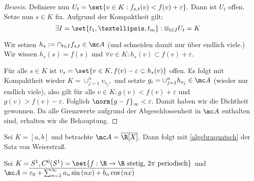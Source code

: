 \begin{theorem}
\begin{proof}[Beweis]
		Definiere nun $U_t = \set{v \in K: f_{s, t}(v) < f(v)+\varepsilon}.$ Dann ist $U_t$ offen. Setze nun $s \in K$ fix. Aufgrund der Kompaktheit gilt: \[\exists I = \set{t_1, …, t_m}: \Cup_{t \in I}U_t = K\] 
		
		Wir setzen $h_s := \cap_{t \in I}f_{s, t} \in \mc A$ (und schneiden damit nur über endlich viele.) Wir wissen $h_s(s)=f(s)$ und $\forall v \in K: h_s(v) \subset f(v)+\varepsilon.$
		
		Für alle $s \in K$ ist $v_s = \set{v \in K, f(v)- \varepsilon \subset h_s(v)}$ offen. Es folgt mit Kompaktheit wieder $K = \cup_{j=1}^n v_{s_j},$ und setzte $g_i = \cup_{j=1}^n h_{s_j} \in \mc A$ (wieder nur endlich viele), also gilt für alle $v \in K: g(v) < f(v)+\varepsilon$ und $g(v) > f(v) -\varepsilon.$ Folglich $\norm{g-f}_{\infty} < \varepsilon.$ Damit haben wir die Dichtheit gewonnen. Da alle Grenzwerte aufgrund der Abgeschlossenheit in $\mc A$ enthalten sind, erhalten wir die Behauptung.
		
	\end{proof}
	
\end{theorem}


\begin{ex} Sei $K = [a, b]$ und betrachte $\mc A = \overline{\R[X]}.$ Dann folgt mit \ref{algebraquatsch} der Satz von Weierstraß. 
	
\end{ex}


\begin{ex} Sei $K = S^1, C^0(S^1) = \set{f: \R \to \R \text{ stetig, }2\pi \text{ periodisch}}$ und \\\(\mc A = \overline{\varepsilon_0 + \sum_{n = 1}^{\infty}a_n \sin{(nx)} + b_n \cos{(nx)}}\)
	
\end{ex}

